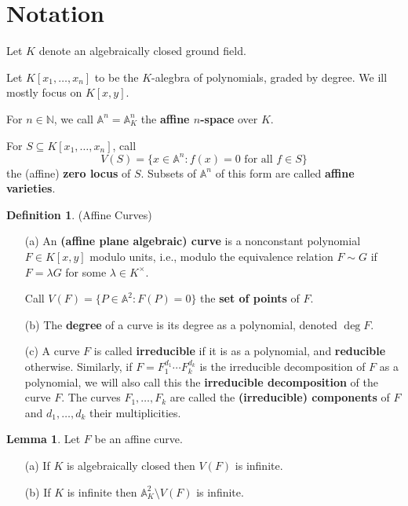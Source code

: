 \documentclass[12pt]{article}
\theoremstyle{definition}
\newtheorem{lemma}{Lemma}
\newtheorem{definition}{Definition}
\newcommand{\N}{\mathbb{N}}
\newcommand{\<}{\langle}
\renewcommand{\>}{\rangle}
\newcommand{\A}{\mathbb{A}}
\begin{document}
\thispagestyle{title}

\section*{Notation}

Let $K$ denote an algebraically closed ground field.

Let $K[x_1, \dots, x_n]$ to be the $K$-alegbra of polynomials, graded by degree. We ill mostly focus on $K[x, y]$.

For $n \in \N$, we call $\A^n = \A_K^n$ the \textbf{affine $n$-space} over $K$.

For $S \subseteq K[x_1, \dots, x_n]$, call
\[
    V(S) = \{x \in \A^n : f(x) = 0 \text{ for all } f \in S\}
\]
the (affine) \textbf{zero locus} of $S$. Subsets of $\A^n$ of this form are called \textbf{affine varieties}.




\begin{definition}(Affine Curves)
    \begin{itemize}
        \item[(a)] An \textbf{(affine plane algebraic) curve} is a nonconstant polynomial $F \in K[x, y]$ modulo units, i.e., modulo the equivalence relation $F \sim G$ if $F = \lambda G$ for some $\lambda \in K^\times$. 

        Call $V(F) = \{P \in \A^2 : F(P) = 0\}$ the \textbf{set of points} of $F$.
        
        \item[(b)] The \textbf{degree} of a curve is its degree as a polynomial, denoted $\deg F$.
        
        \item[(c)] A curve $F$ is called \textbf{irreducible} if it is as a polynomial, and \textbf{reducible} otherwise. Similarly, if $F = F_1^{d_1} \cdots F_k^{d_k}$ is the irreducible decomposition of $F$ as a polynomial, we will also call this the \textbf{irreducible decomposition} of the curve $F$. The curves $F_1, \dots, F_k$ are called the \textbf{(irreducible) components} of $F$ and $d_1, \dots, d_k$ their multiplicities.
    \end{itemize}
    
\end{definition}


\begin{lemma}
    Let $F$ be an affine curve.
    \begin{itemize}
        \item[(a)] If $K$ is algebraically closed then $V(F)$ is infinite.
        \item[(b)] If $K$ is infinite then $\A_K^2 \setminus V(F)$ is infinite.
    \end{itemize}
\end{lemma}
\end{document}

